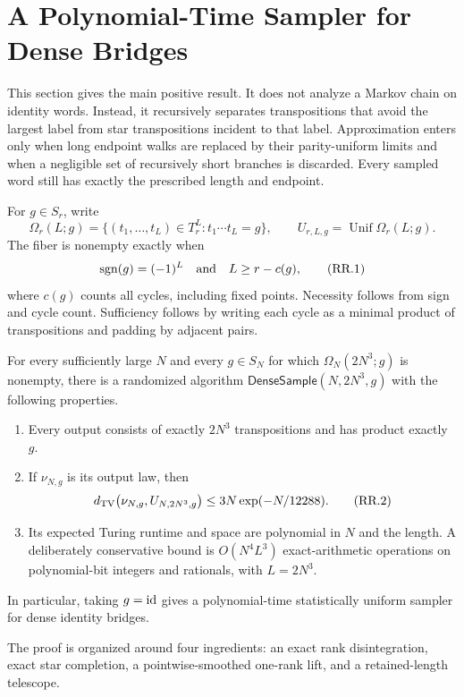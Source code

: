 \section{A Polynomial-Time Sampler for Dense Bridges}
\label{sec:rank-recursive-sampler}

This section gives the main positive result.  It does not analyze a Markov
chain on identity words.  Instead, it recursively separates transpositions
that avoid the largest label from star transpositions incident to that label.
Approximation enters only when long endpoint walks are replaced by their
parity-uniform limits and when a negligible set of recursively short branches
is discarded.  Every sampled word still has exactly the prescribed length and
endpoint.

For $g\in S_r$, write
\[
  \Omega_r(L;g)
  =
  \{(t_1,\ldots,t_L)\in T_r^L:t_1\cdots t_L=g\},
  \qquad
  U_{r,L,g}=\operatorname{Unif}\Omega_r(L;g).
\]
The fiber is nonempty exactly when
\[
  \operatorname{sgn}(g)=(-1)^L
  \quad\hbox{and}\quad
  L\ge r-c(g),
  \tag{RR.1}
\]
where $c(g)$ counts all cycles, including fixed points.  Necessity follows
from sign and cycle count.  Sufficiency follows by writing each cycle as a
minimal product of transpositions and padding by adjacent pairs.

\begin{theorem}
\label{thm:dense-rank-recursion}
For every sufficiently large $N$ and every $g\in S_N$ for which
$\Omega_N(2N^3;g)$ is nonempty, there is a randomized algorithm
$\mathsf{DenseSample}(N,2N^3,g)$ with the following properties.
\begin{enumerate}
\item Every output consists of exactly $2N^3$ transpositions and has product
  exactly $g$.
\item If $\nu_{N,g}$ is its output law, then
  \[
    d_{\mathrm{TV}}\bigl(\nu_{N,g},U_{N,2N^3,g}\bigr)
    \le 3N\exp(-N/12288).
    \tag{RR.2}
  \]
\item Its expected Turing runtime and space are polynomial in $N$ and the
  length.  A deliberately conservative bound is
  $O(N^4L^3)$ exact-arithmetic operations on polynomial-bit integers and
  rationals, with $L=2N^3$.
\end{enumerate}
In particular, taking $g=\mathrm{id}$ gives a polynomial-time statistically uniform
sampler for dense identity bridges.
\end{theorem}

The proof is organized around four ingredients: an exact rank
disintegration, exact star completion, a pointwise-smoothed one-rank lift, and
a retained-length telescope.

